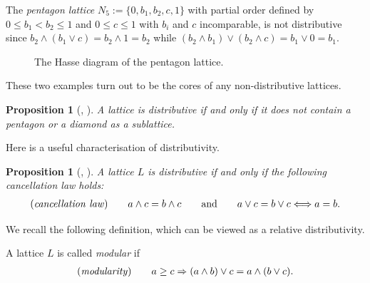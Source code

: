 \documentclass[pdftex]{sigma}
\numberwithin{equation}{section}
\newtheorem{Proposition}[Theorem]{Proposition}
\begin{document}
\begin{Example}\label{ex:pentagon}
 The {\it pentagon lattice} $N_5:=\{0,b_1,b_2,c,1\}$ with partial order defined by
$0\leq b_1< b_2\leq1$ and $0\leq c\leq 1$ with $b_i$ and $c$ incomparable, is not distributive since $b_2\wedge (b_1\vee c)=b_2\wedge 1=b_2$ while $(b_2\wedge b_1)\vee(b_2\wedge c)=b_1\vee 0=b_1$.
\begin{figure}[h!]\centering
{}
\caption{The Hasse diagram of the pentagon lattice.}
\end{figure}
\end{Example}

These two examples turn out to be the cores of any non-distributive lattices.

\begin{Proposition}[{\cite[Chapter~IX, Theorem~2]{B}, \cite[Theorems~101 and 102]{Gra1}}]\label{prop:charnondist}
A lattice is distributive if and only if it does not contain a pentagon or a diamond as a sublattice.
\end{Proposition}

Here is a useful characterisation of distributivity.
\begin{Proposition}[{\cite[Theorem~I.10]{B}, \cite[Corollary~3.1.3]{PR}}]%
A lattice $L$ is distributive if and only if the following {\it cancellation law} holds:
\begin{gather*}%
({\it cancellation\ law})\qquad a\wedge c= b\wedge c\qquad {\rm and}\qquad a\vee c= b\vee c \Longleftrightarrow a=b.
\end{gather*}
 \end{Proposition}


We recall the following definition, which can be viewed as a relative distributivity.

\begin{Definition} \label{defn:modularlattice}
A lattice $L$ is called {\it modular} if
\begin{gather*}
({\it modularity})\qquad 	a\geq c \Rightarrow (a\wedge b)\vee c= a \wedge (b\vee c).
\end{gather*}
\end{Definition}
\end{document}

